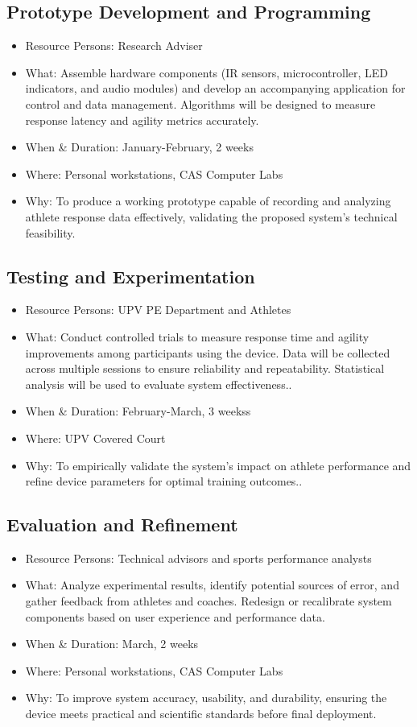\subsection{Prototype Development and Programming}
\begin{itemize}
	\item Resource Persons: Research Adviser
	\item What: Assemble hardware components (IR sensors, microcontroller, LED indicators, and audio modules) and develop an accompanying application for control and data management. Algorithms will be designed to measure response latency and agility metrics accurately.
	\item When & Duration: January-February, 2 weeks
	\item Where: Personal workstations, CAS Computer Labs
	\item Why: To produce a working prototype capable of recording and analyzing athlete response data effectively, validating the proposed system’s technical feasibility.
\end{itemize}


\subsection{Testing and Experimentation}
\begin{itemize}
	\item Resource Persons: UPV PE Department and Athletes
	\item What: Conduct controlled trials to measure response time and agility improvements among participants using the device. Data will be collected across multiple sessions to ensure reliability and repeatability. Statistical analysis will be used to evaluate system effectiveness..
	\item When & Duration: February-March, 3 weekss
	\item Where: UPV Covered Court
	\item Why: To empirically validate the system’s impact on athlete performance and refine device parameters for optimal training outcomes..
\end{itemize}

\subsection{Evaluation and Refinement}
\begin{itemize}
	\item Resource Persons: Technical advisors and sports performance analysts
	\item What: Analyze experimental results, identify potential sources of error, and gather feedback from athletes and coaches. Redesign or recalibrate system components based on user experience and performance data.
	\item When & Duration: March, 2 weeks
	\item Where: Personal workstations, CAS Computer Labs
	\item Why: To improve system accuracy, usability, and durability, ensuring the device meets practical and scientific standards before final deployment.
\end{itemize}

